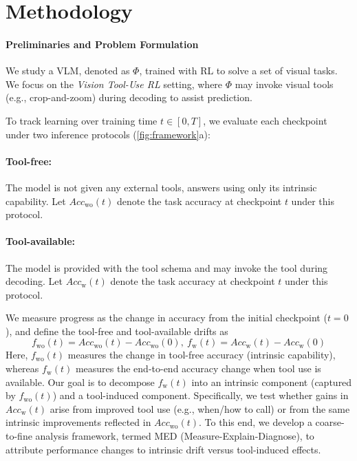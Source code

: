 \section{Methodology}

\paragraph{Preliminaries and Problem Formulation}
%
We study a VLM, denoted as $\Phi$, trained with RL to solve a set of visual tasks. We focus on the \textit{Vision Tool-Use RL} setting, where $\Phi$ may invoke visual tools (e.g., crop-and-zoom) during decoding to assist prediction.

To track learning over training time $t \in [0, T]$, we evaluate each checkpoint under two inference protocols (\cref{fig:framework}a):
%
\paragraph{Tool-free:} The model is not given any external tools, answers using only its intrinsic capability. Let $Acc_{\mathrm{wo}}(t)$ denote the task accuracy at checkpoint $t$ under this protocol.
%
\paragraph{Tool-available:} The model is provided with the tool schema and may invoke the tool during decoding. Let $Acc_{\mathrm{w}}(t)$ denote the task accuracy at checkpoint $t$ under this protocol.

We measure progress as the change in accuracy from the initial checkpoint ($t=0$), and define the tool-free and tool-available drifts as
\begin{equation}
    f_{\mathrm{wo}}(t) = Acc_{\mathrm{wo}}(t) - Acc_{\mathrm{wo}}(0),~ f_{\mathrm{w}}(t) = Acc_{\mathrm{w}}(t) - Acc_{\mathrm{w}}(0)
\label{eq:drift_def}
\end{equation}
%
Here, $f_{\mathrm{wo}}(t)$ measures the change in tool-free accuracy (intrinsic capability), whereas $f_{\mathrm{w}}(t)$ measures the end-to-end accuracy change when tool use is available.
%
Our goal is to decompose $f_{\mathrm{w}}(t)$ into an intrinsic component (captured by $f_{\mathrm{wo}}(t)$) and a tool-induced component. Specifically, we test whether gains in $Acc_{\mathrm{w}}(t)$ arise from improved tool use (e.g., when/how to call) or from the same intrinsic improvements reflected in $Acc_{\mathrm{wo}}(t)$.
%
To this end, we develop a coarse-to-fine analysis framework, termed MED (Measure-Explain-Diagnose), to attribute performance changes to intrinsic drift versus tool-induced effects. 

